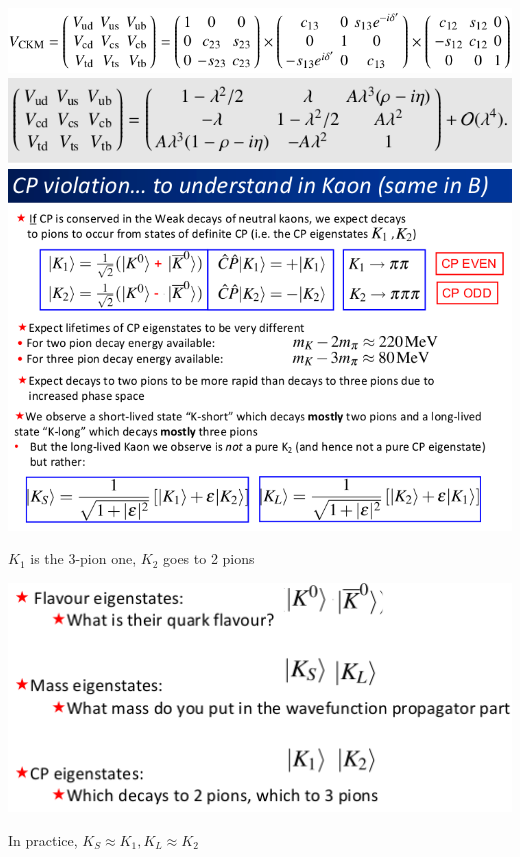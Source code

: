 \begin{center}
    \includegraphics[width=\linewidth]{images/ckm_parametrization.png}
    \includegraphics[width=\linewidth]{images/ckm_wolfenstein.png}
    \includegraphics[width=\linewidth]{images/kshort_klong.png}

    $K_1$ is the 3-pion one, $K_2$ goes to 2 pions

    \includegraphics[width=\linewidth]{images/kaon_eigenstates.png}
\end{center}

In practice, $K_S \approx K_1, K_L \approx K_2$

